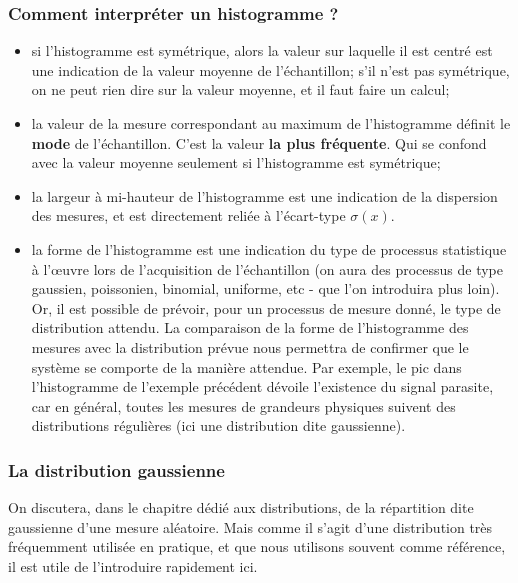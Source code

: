 \documentclass[main.tex]{subfiles}
\begin{document}
\subsubsection{Comment interpréter un histogramme ?}

\begin{itemize}
    \item si l'histogramme est symétrique, alors la valeur sur laquelle il est centré est une indication de la valeur moyenne de l'échantillon; s'il n'est pas symétrique, on ne peut rien dire sur la valeur moyenne, et il faut faire un calcul;
    \item la valeur de la mesure correspondant au maximum de l'histogramme définit le \textbf{mode} de l'échantillon. C'est la valeur \textbf{la plus fréquente}. Qui se confond avec la valeur moyenne seulement si l'histogramme est symétrique;
    \item la largeur à mi-hauteur de l'histogramme est une indication de la dispersion des mesures, et est directement reliée à l'écart-type $\sigma(x)$.
    \item la forme de l'histogramme est une indication du type de processus statistique à l'\oe uvre lors de l'acquisition de l'échantillon (on aura des processus de type gaussien, poissonien, binomial, uniforme, etc - que l'on introduira plus loin). Or, il est possible de prévoir, pour un processus de mesure donné, le type de distribution attendu. La comparaison de la forme de l'histogramme des mesures avec la distribution prévue nous permettra de confirmer que le système se comporte de la manière attendue. Par exemple, le pic dans l'histogramme de l'exemple précédent dévoile l'existence du signal parasite, car en général, toutes les mesures de grandeurs physiques suivent des distributions régulières (ici une distribution dite gaussienne).
\end{itemize}

\subsubsection{La distribution gaussienne}

On discutera, dans le chapitre dédié aux distributions, de la répartition dite gaussienne d'une mesure aléatoire. Mais comme il s'agit d'une distribution très fréquemment utilisée en pratique, et que nous utilisons souvent comme référence, il est utile de l'introduire rapidement ici.
\end{document}
